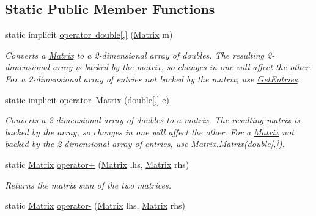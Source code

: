 \subsection*{Static Public Member Functions}
\begin{DoxyCompactItemize}
\item 
static implicit \mbox{\hyperlink{class_matrix_demo_1_1_r_t_w_1_1_matrix_ac23641ac04b3c3baf14174bdf9049db2}{operator double\mbox{[},\mbox{]}}} (\mbox{\hyperlink{class_matrix_demo_1_1_r_t_w_1_1_matrix}{Matrix}} m)
\begin{DoxyCompactList}\small\item\em Converts a \mbox{\hyperlink{class_matrix_demo_1_1_r_t_w_1_1_matrix}{Matrix}} to a 2-\/dimensional array of doubles. The resulting 2-\/dimensional array is backed by the matrix, so changes in one will affect the other. For a 2-\/dimensional array of entries not backed by the matrix, use \mbox{\hyperlink{class_matrix_demo_1_1_r_t_w_1_1_matrix_a9f6f8e0e7acfbdd55852f258daf68b8f}{Get\+Entries}}. \end{DoxyCompactList}\item 
static implicit \mbox{\hyperlink{class_matrix_demo_1_1_r_t_w_1_1_matrix_a0c737f7e6b54edac4d26b4f1c595ee92}{operator Matrix}} (double\mbox{[},\mbox{]} e)
\begin{DoxyCompactList}\small\item\em Converts a 2-\/dimensional array of doubles to a matrix. The resulting matrix is backed by the array, so changes in one will affect the other. For a \mbox{\hyperlink{class_matrix_demo_1_1_r_t_w_1_1_matrix}{Matrix}} not backed by the 2-\/dimensional array of entries, use \mbox{\hyperlink{class_matrix_demo_1_1_r_t_w_1_1_matrix_ad2a320fd0c86551f34070679fd43433c}{Matrix.\+Matrix(double\mbox{[},\mbox{]})}}. \end{DoxyCompactList}\item 
static \mbox{\hyperlink{class_matrix_demo_1_1_r_t_w_1_1_matrix}{Matrix}} \mbox{\hyperlink{class_matrix_demo_1_1_r_t_w_1_1_matrix_a6c0787446dfff85088742793f129729a}{operator+}} (\mbox{\hyperlink{class_matrix_demo_1_1_r_t_w_1_1_matrix}{Matrix}} lhs, \mbox{\hyperlink{class_matrix_demo_1_1_r_t_w_1_1_matrix}{Matrix}} rhs)
\begin{DoxyCompactList}\small\item\em Returns the matrix sum of the two matrices. \end{DoxyCompactList}\item 
static \mbox{\hyperlink{class_matrix_demo_1_1_r_t_w_1_1_matrix}{Matrix}} \mbox{\hyperlink{class_matrix_demo_1_1_r_t_w_1_1_matrix_a7d96c0cc84a8ae412014464007fbb576}{operator-\/}} (\mbox{\hyperlink{class_matrix_demo_1_1_r_t_w_1_1_matrix}{Matrix}} lhs, \mbox{\hyperlink{class_matrix_demo_1_1_r_t_w_1_1_matrix}{Matrix}} rhs)

\end{DoxyCompactItemize}
